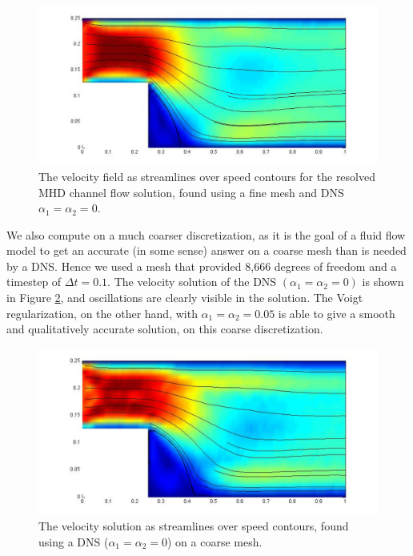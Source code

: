 \documentclass[11pt]{article}%
\numberwithin{equation}{section}
\begin{document}
\begin{figure}[htb]
\begin{center}
\includegraphics[width=.9\textwidth,height=0.25\textwidth, viewport=110 50 780 370, clip]{MHDChannel_DNSfine.pdf}
\caption{\label{mhdchannel_dnsfine} The velocity field as streamlines over speed contours for the resolved MHD channel flow solution, found using a fine mesh and DNS $\alpha_1=\alpha_2=0$.}
\end{center}
\end{figure}

We also compute on a much coarser discretization, as it is the goal of a fluid flow model to get an accurate (in some sense) answer on a coarse mesh than is needed by a DNS.  Hence we used a mesh that provided 8,666 degrees of freedom and a timestep of $\Delta t=0.1$.  The velocity solution of the DNS $(\alpha_1=\alpha_2=0)$ is shown in Figure \ref{mhdchannel_dnscoarse}, and oscillations are clearly visible in the solution.  The Voigt regularization, on the other hand,
with $\alpha_1=\alpha_2=0.05$ is able to give a smooth and qualitatively accurate solution, on this coarse discretization.

\begin{figure}[htb]
\begin{center}
\includegraphics[width=.9\textwidth,height=0.25\textwidth, viewport=110 50 750 370, clip]{MHDChannel_DNScoarse.pdf}
\caption{\label{mhdchannel_dnscoarse} The velocity solution as streamlines over speed contours, found using a DNS  ($\alpha_1=\alpha_2=0$) on a coarse mesh.}
\end{center}
\end{figure}
\end{document}

